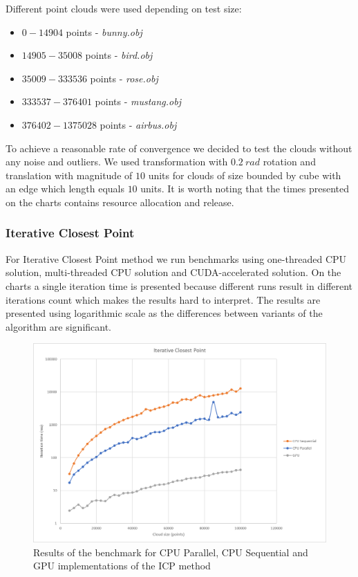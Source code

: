 \documentclass[titlepage]{article}
\begin{document}
Different point clouds were used depending on test size:
\begin{itemize}
\item $0 - 14904$ points - \textit{bunny.obj}
\item $14905 - 35008$ points - \textit{bird.obj}
\item $35009 - 333536$ points - \textit{rose.obj}
\item $333537 - 376401$ points - \textit{mustang.obj}
\item $376402 - 1375028$ points - \textit{airbus.obj}
\end{itemize}

To achieve a reasonable rate of convergence we decided to test the clouds without any noise and outliers. We used transformation with $0.2\: rad$ rotation and translation with magnitude of $10$ units for clouds of size bounded by cube with an edge which length equals $10$ units. It is worth noting that the times presented on the charts contains resource allocation and release.

\subsubsection{Iterative Closest Point}
For Iterative Closest Point method we run benchmarks using one-threaded CPU solution, multi-threaded CPU solution and CUDA-accelerated solution. On the charts a single iteration time is presented because different runs result in different iterations count which makes the results hard to interpret. The results are presented using logarithmic scale as the differences between variants of the algorithm are significant.

\begin{figure}[H]
\includegraphics[width=\textwidth]{ms-icp-1.png}
\caption{Results of the benchmark for CPU Parallel, CPU Sequential and GPU implementations of the ICP method}
\end{figure} 
\end{document}
